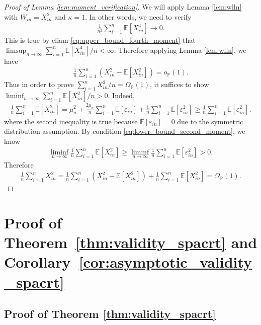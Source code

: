 \documentclass[12pt]{article}
\theoremstyle{definition}
\def\P{\mathbb{P}}
\def\P{\mathbb{P}}
\newcommand{\E}{\mathbb E}								%
\renewcommand{\P}{\mathbb{P}}							%
\begin{document}
\begin{proof}[Proof of Lemma \ref{lem:moment_verification}]
		We will apply Lemma \ref{lem:wlln} with $W_{in}=X_{in}^2$ and $\kappa=1$. In other words, we need to verify 
		\begin{align*}
			\frac{1}{n^2}\sum_{i=1}^n \E[X_{in}^4]\rightarrow0.
		\end{align*}
		This is true by cliam \eqref{eq:upper_bound_fourth_moment} that $\limsup_{n\rightarrow\infty}\sum_{i=1}^n \E[X_{in}^4]/n<\infty$. Therefore applying Lemma \ref{lem:wlln}, we have 
		\begin{align*}
			\frac{1}{n}\sum_{i=1}^n (X_{in}^2-\E[X_{in}^2])=o_{\P}(1).
		\end{align*}
		Thus in order to prove $\sum_{i=1}^n X_{in}^2/n=\Omega_{\P}(1)$, it suffices to show $\liminf_{n\rightarrow\infty}\sum_{i=1}^n \E[X_{in}^2]/n>0$. Indeed,
		\begin{align*}
			\frac{1}{n}\sum_{i=1}^n \E[X_{in}^2]=\mu_n^2+\frac{2\mu_n}{n}\sum_{i=1}^n \E[\varepsilon_{in}]+\frac{1}{n}\sum_{i=1}^n \E[\varepsilon_{in}^2]\geq \frac{1}{n}\sum_{i=1}^n \E[\varepsilon_{in}^2].
		\end{align*}
		where the second inequality is true because $\E[\varepsilon_{in}]=0$ due to the symmetric distribution assumption. By condition \eqref{eq:lower_bound_second_moment}, we know 
		\begin{align*}
			\liminf_{n\rightarrow\infty}\frac{1}{n}\sum_{i=1}^n \E[X_{in}^2]\geq \liminf_{n\rightarrow\infty}\frac{1}{n}\sum_{i=1}^n \E[\varepsilon_{in}^2]>0.
		\end{align*}
		Therefore 
		\begin{align*}
			\frac{1}{n}\sum_{i=1}^n X_{in}^2=\frac{1}{n}\sum_{i=1}^n (X_{in}^2-\E[X_{in}^2])+\frac{1}{n}\sum_{i=1}^n\E[X_{in}^2]=\Omega_{\P}(1).
		\end{align*}
	\end{proof}
  

	


\section{Proof of Theorem~\ref{thm:validity_spacrt} and Corollary~\ref{cor:asymptotic_validity_spacrt}}\label{sec:proof_general_results}

\subsection{Proof of Theorem \ref{thm:validity_spacrt}}
\end{document}
